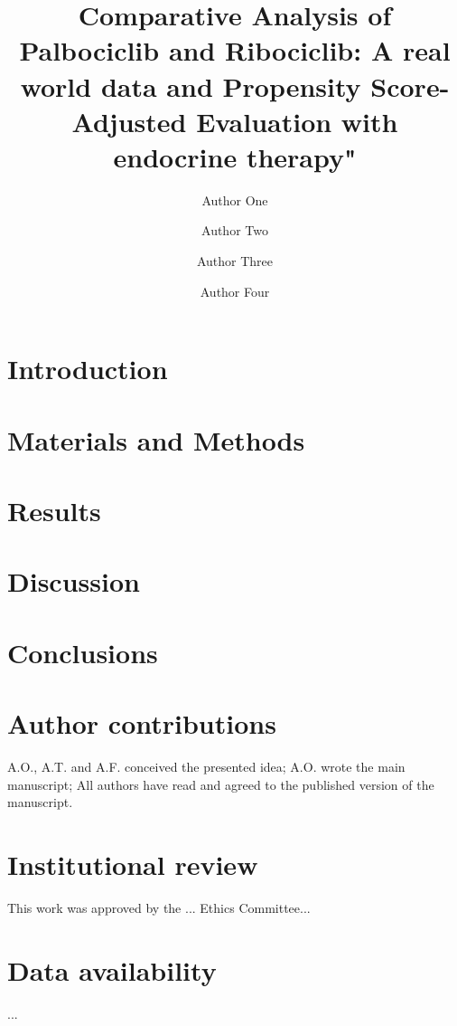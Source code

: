 \documentclass[fleqn,10pt,lineno]{manuscript}
\title{Comparative Analysis of Palbociclib and Ribociclib: A real world data and Propensity Score-Adjusted Evaluation with endocrine therapy"}
\author[1]{Author One}
\author[1]{Author Two}
\author[2,3]{Author Three}
\author[1]{Author Four}
\affil[1]{Author one affiliation}
\affil[2]{Author two affiliation}
\affil[3]{Author three affiliation}
\begin{document}
\flushbottom
\maketitle
\thispagestyle{empty}


\section*{Introduction}


\section*{Materials and Methods}


\section*{Results}



 
\section*{Discussion}



\section*{Conclusions}



\section*{Author contributions}
A.O., A.T. and A.F. conceived the presented idea; A.O. wrote the main manuscript; All authors have read and agreed to the published version of the manuscript.

\section*{Institutional review}
This work was approved by the ... Ethics Committee...

\section*{Data availability} 
...
\end{document}
